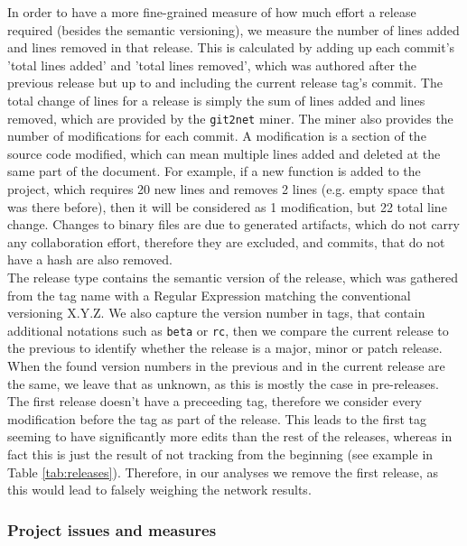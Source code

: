 In order to have a more fine-grained measure of how much effort a release required (besides the semantic versioning), we measure the number of lines added and lines removed in that release. This is calculated by adding up each commit's 'total lines added' and 'total lines removed', which was authored after the previous release but up to and including the current release tag's commit. The total change of lines for a release is simply the sum of lines added and lines removed, which are provided by the \texttt{git2net} miner. The miner also provides the number of modifications for each commit. A modification is a section of the source code modified, which can mean multiple lines added and deleted at the same part of the document. For example, if a new function is added to the project, which requires 20 new lines and removes 2 lines (e.g. empty space that was there before), then it will be considered as 1 modification, but 22 total line change. Changes to binary files are due to generated artifacts, which do not carry any collaboration effort, therefore they are excluded, and commits, that do not have a hash are also removed. \\

The release type contains the semantic version of the release, which was gathered from the tag name with a Regular Expression matching the conventional versioning X.Y.Z. We also capture the version number in tags, that contain additional notations such as \texttt{beta} or \texttt{rc}, then we compare the current release to the previous to identify whether the release is a major, minor or patch release. When the found version numbers in the previous and in the current release are the same, we leave that as unknown, as this is mostly the case in pre-releases. The first release doesn't have a preceeding tag, therefore we consider every modification before the tag as part of the release. This leads to the first tag seeming to have significantly more edits than the rest of the releases, whereas in fact this is just the result of not tracking from the beginning (see example in Table \ref{tab:releases}). Therefore, in our analyses we remove the first release, as this would lead to falsely weighing the network results. \\



\subsubsection{Project issues and measures}

